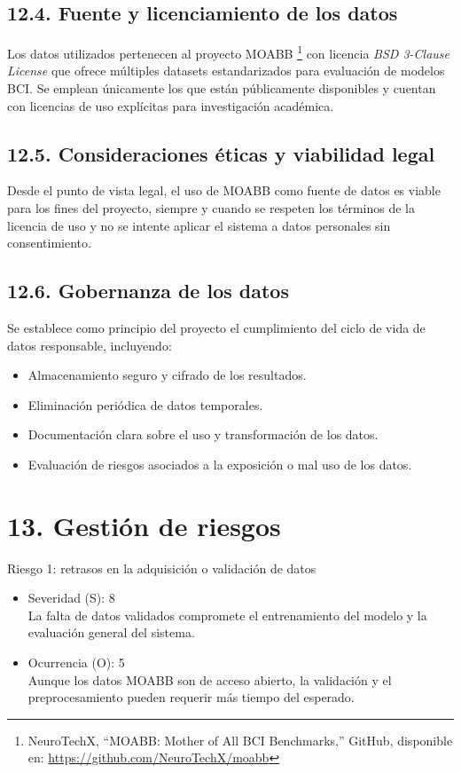 \documentclass[
11pt, %
]{charter}
\begin{document}
\subsection*{12.4. Fuente y licenciamiento de los datos}

Los datos utilizados pertenecen al proyecto MOABB \footnote{NeuroTechX, ``MOABB: Mother of All BCI Benchmarks,'' GitHub, disponible en: \url{https://github.com/NeuroTechX/moabb}} con licencia \textit{BSD 3-Clause License}
que ofrece múltiples datasets estandarizados para evaluación de modelos BCI. Se emplean únicamente los que están públicamente disponibles y cuentan con licencias de uso explícitas para investigación académica.

\subsection*{12.5. Consideraciones éticas y viabilidad legal}

Desde el punto de vista legal, el uso de MOABB como fuente de datos es viable para los fines del proyecto, siempre y cuando se respeten los términos de la licencia de uso y no se intente aplicar el sistema a datos personales sin consentimiento.

\subsection*{12.6. Gobernanza de los datos}

Se establece como principio del proyecto el cumplimiento del ciclo de vida de datos responsable, incluyendo:
\begin{itemize}
  \item Almacenamiento seguro y cifrado de los resultados.
  \item Eliminación periódica de datos temporales.
  \item Documentación clara sobre el uso y transformación de los datos.
  \item Evaluación de riesgos asociados a la exposición o mal uso de los datos.
\end{itemize}


\section{13. Gestión de riesgos}
\label{sec:riesgos}

Riesgo 1: retrasos en la adquisición o validación de datos
\begin{itemize}
    \item Severidad (S): 8 \\
    La falta de datos validados compromete el entrenamiento del modelo y la evaluación general del sistema.
    \item Ocurrencia (O): 5 \\
    Aunque los datos MOABB son de acceso abierto, la validación y el preprocesamiento pueden requerir más tiempo del esperado.
\end{itemize}
\end{document}
